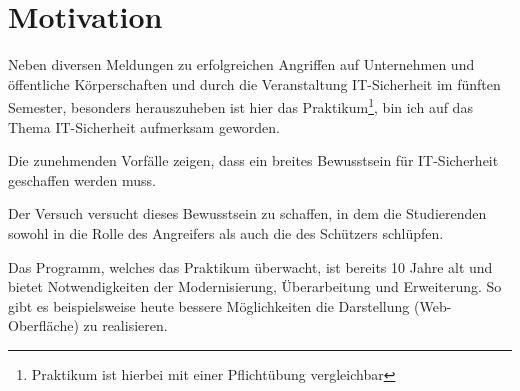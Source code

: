\section{Motivation}
\label{sec:Motivation}
Neben diversen Meldungen zu erfolgreichen Angriffen auf Unternehmen und öffentliche Körperschaften und durch die Veranstaltung IT-Sicherheit im fünften Semester, besonders herauszuheben ist hier das Praktikum\footnote{Praktikum ist hierbei mit einer Pflichtübung vergleichbar}, bin ich auf das Thema IT-Sicherheit aufmerksam geworden. 

Die zunehmenden Vorfälle zeigen, dass ein breites Bewusstsein für IT-Sicherheit geschaffen werden muss.

Der Versuch  versucht dieses Bewusstsein zu schaffen, in dem die Studierenden sowohl in die Rolle des Angreifers als auch die des Schützers schlüpfen.

Das Programm, welches das Praktikum überwacht, ist bereits 10 Jahre alt und bietet Notwendigkeiten der Modernisierung, Überarbeitung und Erweiterung. 
So gibt es beispielsweise heute bessere Möglichkeiten die Darstellung (Web-Oberfläche) zu realisieren.